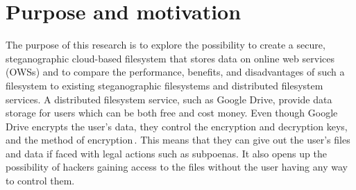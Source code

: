 
\section{Purpose and motivation}

The purpose of this research is to explore the possibility to create a secure, steganographic cloud-based filesystem that stores data on online web services (OWSs) and to compare the performance, benefits, and disadvantages of such a filesystem to existing steganographic filesystems and distributed filesystem services. A distributed filesystem service, such as Google Drive, provide data storage for users which can be both free and cost money. Even though Google Drive encrypts the user's data, they control the encryption and decryption keys, and the method of encryption\,\cite{johnsonGoogleDriveSecure2021}. This means that they can give out the user's files and data if faced with legal actions such as subpoenas. It also opens up the possibility of hackers gaining access to the files without the user having any way to control them.


